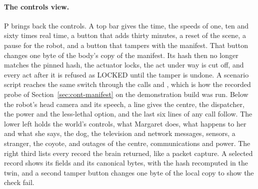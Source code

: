 \paragraph{The controls view.}
P brings back the controls. A top bar gives the time, the speeds of one, ten and sixty times real
time, a button that adds thirty minutes, a reset of the scene, a pause for the robot, and a button
that tampers with the manifest. That button changes one byte of the body's copy of the manifest.
Its hash then no longer matches the pinned hash, the actuator locks, the act under way is cut off,
and every act after it is refused as LOCKED until the tamper is undone. A scenario script reaches
the same switch through the calls  and ,
which is how the recorded probe of Section~\ref{sec:cont-manifest} on the demonstration build was
run. Below the robot's head
camera and its speech, a line gives the centre, the dispatcher, the power and the less-lethal
option, and the last six lines of any call follow. The lower left holds the world's controls, what
Margaret does, what happens to her and what she says, the dog, the television and network
messages, sensors, a stranger, the coyote, and outages of the centre, communications and power.
The right third lists every record the brain returned, like a packet capture. A selected record
shows its fields and its canonical bytes, with the hash recomputed in the twin, and a second
tamper button changes one byte of the local copy to show the check fail.

